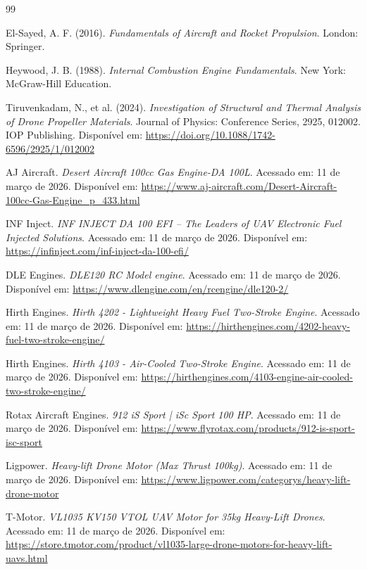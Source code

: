 \documentclass[a4paper,12pt]{article}
\begin{document}
\begin{thebibliography}{99}

    El-Sayed, A. F. (2016). \textit{Fundamentals of Aircraft and Rocket Propulsion}. London: Springer.

    Heywood, J. B. (1988). \textit{Internal Combustion Engine Fundamentals}. New York: McGraw-Hill Education.

    Tiruvenkadam, N., et al. (2024). \textit{Investigation of Structural and Thermal Analysis of Drone Propeller Materials}. Journal of Physics: Conference Series, 2925, 012002. IOP Publishing. Disponível em: \url{https://doi.org/10.1088/1742-6596/2925/1/012002}

    AJ Aircraft. \textit{Desert Aircraft 100cc Gas Engine-DA 100L}. Acessado em: 11 de março de 2026. Disponível em: \url{https://www.aj-aircraft.com/Desert-Aircraft-100cc-Gas-Engine_p_433.html}

    INF Inject. \textit{INF INJECT DA 100 EFI – The Leaders of UAV Electronic Fuel Injected Solutions}. Acessado em: 11 de março de 2026. Disponível em: \url{https://infinject.com/inf-inject-da-100-efi/}

    DLE Engines. \textit{DLE120 RC Model engine}. Acessado em: 11 de março de 2026. Disponível em: \url{https://www.dlengine.com/en/rcengine/dle120-2/}

    Hirth Engines. \textit{Hirth 4202 - Lightweight Heavy Fuel Two-Stroke Engine}. Acessado em: 11 de março de 2026. Disponível em: \url{https://hirthengines.com/4202-heavy-fuel-two-stroke-engine/}

    Hirth Engines. \textit{Hirth 4103 - Air-Cooled Two-Stroke Engine}. Acessado em: 11 de março de 2026. Disponível em: \url{https://hirthengines.com/4103-engine-air-cooled-two-stroke-engine/}

    Rotax Aircraft Engines. \textit{912 iS Sport | iSc Sport 100 HP}. Acessado em: 11 de março de 2026. Disponível em: \url{https://www.flyrotax.com/products/912-is-sport-isc-sport}

    Ligpower. \textit{Heavy-lift Drone Motor (Max Thrust 100kg)}. Acessado em: 11 de março de 2026. Disponível em: \url{https://www.ligpower.com/categorys/heavy-lift-drone-motor}

    T-Motor. \textit{VL1035 KV150 VTOL UAV Motor for 35kg Heavy-Lift Drones}. Acessado em: 11 de março de 2026. Disponível em: \url{https://store.tmotor.com/product/vl1035-large-drone-motors-for-heavy-lift-uavs.html}

\end{thebibliography}
\end{document}
